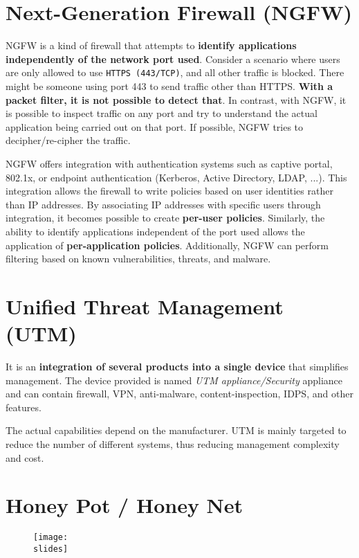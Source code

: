 \section{Next-Generation Firewall (NGFW)}
NGFW is a kind of firewall that attempts to \textbf{identify applications independently of the network port used}.
Consider a scenario where users are only allowed to use \texttt{HTTPS (443/TCP)}, and all other traffic is blocked. There might be someone using port 443 to send traffic other than HTTPS. \textbf{With a packet filter, it is not possible to detect that}. In contrast, with NGFW, it is possible to inspect traffic on any port and try to understand the actual application being carried out on that port. If possible, NGFW tries to decipher/re-cipher the traffic.

NGFW offers integration with authentication systems such as captive portal, 802.1x, or endpoint authentication (Kerberos, Active Directory, LDAP, ...). This integration allows the firewall to write policies based on user identities rather than IP addresses. By associating IP addresses with specific users through integration, it becomes possible to create \textbf{per-user policies}. Similarly, the ability to identify applications independent of the port used allows the application of \textbf{per-application policies}. Additionally, NGFW can perform filtering based on known vulnerabilities, threats, and malware.


\section{Unified Threat Management (UTM)}
It is an \textbf{integration of several products into a single device} that simplifies management. The device provided is named \textit{UTM appliance/Security} appliance and can contain firewall, VPN, anti-malware, content-inspection, IDPS, and other features. 

The actual capabilities depend on the manufacturer. UTM is mainly targeted to reduce the number of different systems, thus reducing management complexity and cost.


\section{Honey Pot / Honey Net}
\begin{figure}[h]
    \centering
    \texttt{[image: \\slides]}
    \label{Honey Pot / Honey Net}
\end{figure}

